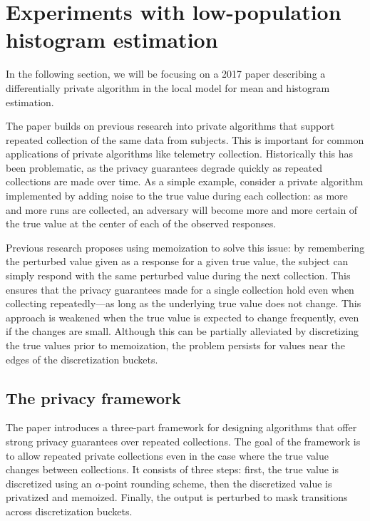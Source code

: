 \documentclass[a4paper,12pt]{article}
\begin{document}
\newpage
\section{Experiments with low-population histogram estimation \label{sec:telemetry}}

In the following section, we will be focusing on a 2017 paper \cite{microsoft_telemetry} describing a differentially private algorithm in the local model for mean and histogram estimation.

The paper builds on previous research \cite{google_rappor} into private algorithms that support repeated collection of the same data from subjects. This is important for common applications of private algorithms like telemetry collection. Historically this has been problematic, as the privacy guarantees degrade quickly as repeated collections are made over time. As a simple example, consider a private algorithm implemented by adding noise to the true value during each collection: as more and more runs are collected, an adversary will become more and more certain of the true value at the center of each of the observed responses.

Previous research \cite{google_rappor} proposes using memoization to solve this issue: by remembering the perturbed value given as a response for a given true value, the subject can simply respond with the same perturbed value during the next collection. This ensures that the privacy guarantees made for a single collection hold even when collecting repeatedly---as long as the underlying true value does not change. This approach is weakened when the true value is expected to change frequently, even if the changes are small. Although this can be partially alleviated by discretizing the true values prior to memoization, the problem persists for values near the edges of the discretization buckets.

\subsection{The privacy framework \label{sec:framework}}

The paper \cite{microsoft_telemetry} introduces a three-part framework for designing algorithms that offer strong privacy guarantees over repeated collections. The goal of the framework is to allow repeated private collections even in the case where the true value changes between collections. It consists of three steps: first, the true value is discretized using an $\alpha$-point rounding scheme, then the discretized value is privatized and memoized. Finally, the output is perturbed to mask transitions across discretization buckets.
\end{document}
